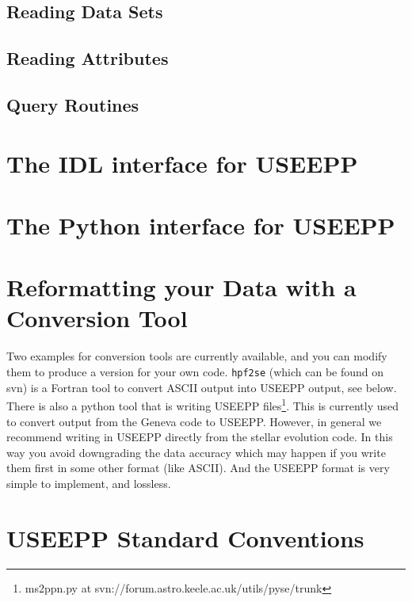 \subsection{Reading Data Sets}

\subsection{Reading Attributes}

\subsection{Query Routines}



\section{The IDL interface for USEEPP}




\section{The Python interface for USEEPP}



\section{Reformatting your Data with a Conversion Tool}

Two examples for conversion tools are currently available, and you can modify them to produce a version for your own code. \verb!hpf2se! (which can be found on svn) is a Fortran tool to convert ASCII output into USEEPP output, see below. There is also a python tool that is writing USEEPP files\footnote{ms2ppn.py at svn://forum.astro.keele.ac.uk/utils/pyse/trunk}. This is currently used to convert output from the Geneva code to USEEPP. However, in general we recommend writing in USEEPP directly from the stellar evolution code. In this way you avoid downgrading the data accuracy which may happen if you write them first in some other format (like ASCII). And the USEEPP format is very simple to implement, and lossless.




\section{USEEPP Standard Conventions}


